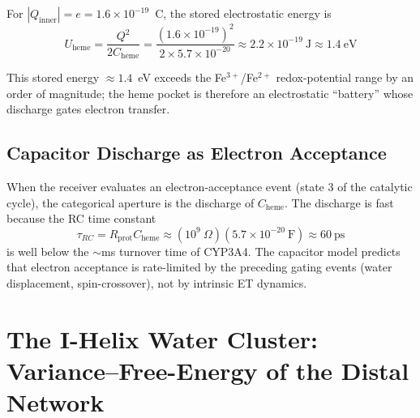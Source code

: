 \documentclass[11pt,twocolumn,a4paper]{article}
\theoremstyle{definition}
\theoremstyle{remark}
\begin{document}
For $|Q_{\mathrm{inner}}| = e = 1.6 \times 10^{-19}$~C, the stored electrostatic energy is
\begin{equation}
U_{\mathrm{heme}} = \frac{Q^2}{2 C_{\mathrm{heme}}}
= \frac{(1.6 \times 10^{-19})^2}{2 \times 5.7 \times 10^{-20}}
\approx 2.2 \times 10^{-19}~\mathrm{J} \approx 1.4~\mathrm{eV}
\label{eq:heme_energy}
\end{equation}

This stored energy $\approx 1.4$~eV exceeds the Fe$^{3+}$/Fe$^{2+}$ redox-potential range by an order of magnitude; the heme pocket is therefore an electrostatic ``battery'' whose discharge gates electron transfer.

\subsection{Capacitor Discharge as Electron Acceptance}

When the receiver evaluates an electron-acceptance event (state 3 of the catalytic cycle), the categorical aperture is the discharge of $C_{\mathrm{heme}}$. The discharge is fast because the RC time constant
\begin{equation}
\tau_{RC} = R_{\mathrm{prot}} C_{\mathrm{heme}}
\approx (10^9~\Omega)(5.7 \times 10^{-20}~\mathrm{F})
\approx 60~\mathrm{ps}
\label{eq:rc_time}
\end{equation}
is well below the $\sim$ms turnover time of CYP3A4. The capacitor model predicts that electron acceptance is rate-limited by the preceding gating events (water displacement, spin-crossover), not by intrinsic ET dynamics.

\section{The I-Helix Water Cluster: Variance--Free-Energy of the Distal Network}
\label{sec:i_helix_water}
\end{document}
